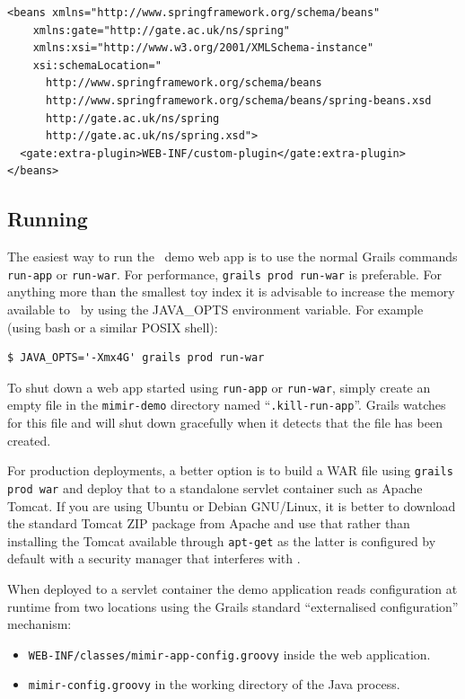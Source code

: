 \begin{lstlisting}
<beans xmlns="http://www.springframework.org/schema/beans"
    xmlns:gate="http://gate.ac.uk/ns/spring"
    xmlns:xsi="http://www.w3.org/2001/XMLSchema-instance"
    xsi:schemaLocation="
      http://www.springframework.org/schema/beans
      http://www.springframework.org/schema/beans/spring-beans.xsd
      http://gate.ac.uk/ns/spring
      http://gate.ac.uk/ns/spring.xsd">
  <gate:extra-plugin>WEB-INF/custom-plugin</gate:extra-plugin>
</beans>
\end{lstlisting}

\subsection{Running}

The easiest way to run the \Mimir\ demo web app is to use the normal Grails
commands {\tt run-app} or {\tt run-war}.  For performance, {\tt grails prod
run-war} is preferable.  For anything more than the smallest toy index it is
advisable to increase the memory available to \Mimir\ by using the JAVA\_OPTS
environment variable.  For example (using bash or a similar POSIX shell):
\begin{verbatim}
$ JAVA_OPTS='-Xmx4G' grails prod run-war
\end{verbatim}

To shut down a web app started using {\tt run-app} or {\tt run-war}, simply
create an empty file in the {\tt mimir-demo} directory named
``{\tt .kill-run-app}''.  Grails watches for this file and will shut down
gracefully when it detects that the file has been created.

For production deployments, a better option is to build a WAR file using
{\tt grails prod war} and deploy that to a standalone servlet container such as
Apache Tomcat.  If you are using Ubuntu or Debian GNU/Linux, it is better to
download the standard Tomcat ZIP package from Apache and use that rather than
installing the Tomcat available through {\tt apt-get} as the latter is
configured by default with a security manager that interferes with \Mimir.

When deployed to a servlet container the demo application reads configuration
at runtime from two locations using the Grails standard ``externalised
configuration'' mechanism:
\begin{itemize}
\item {\tt WEB-INF/classes/mimir-app-config.groovy} inside the web application.
\item {\tt mimir-config.groovy} in the working directory of the Java process.
\end{itemize}

